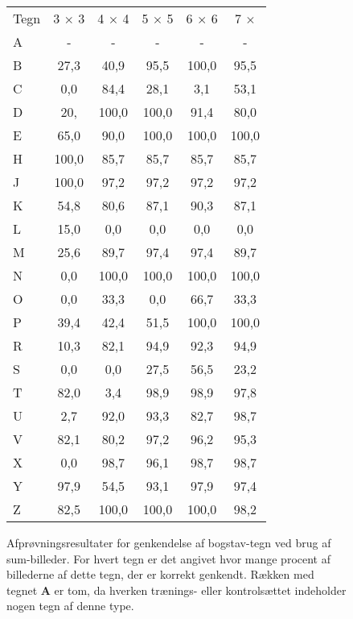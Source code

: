 \begin{figure}[htp]
\centering
\begin{tabular}{|l|c|c|c|c|c|}\hline
\rowcolor[gray]{0.9} \multicolumn{6}{|>{\columncolor[gray]{0.9}}c|}{\textbf{Sum-billeder}} \\ \hline
Tegn & 3 $\times$ 3 & 4 $\times$ 4 & 5 $\times$ 5 & 6 $\times$ 6 & 7 $\times$ \\\hline
A & - & - & - & - & -\\\hline
B & 27,3 & 40,9 & 95,5 & 100,0 & 95,5\\\hline
C & 0,0 & 84,4 & 28,1 & 3,1 & 53,1\\\hline
D & 20, & 100,0 & 100,0 & 91,4 & 80,0\\\hline
E & 65,0 & 90,0 & 100,0 & 100,0 & 100,0\\\hline
H & 100,0 & 85,7 & 85,7 & 85,7 & 85,7\\\hline
J & 100,0 & 97,2 & 97,2 & 97,2 & 97,2\\\hline
K & 54,8 & 80,6 & 87,1 & 90,3 & 87,1\\\hline 
L & 15,0 & 0,0 & 0,0 & 0,0 & 0,0\\\hline
M & 25,6 & 89,7 & 97,4 & 97,4 & 89,7\\\hline
N & 0,0 & 100,0 & 100,0 & 100,0 & 100,0\\\hline
O & 0,0 & 33,3 & 0,0 & 66,7 & 33,3\\\hline
P & 39,4 & 42,4 & 51,5 & 100,0 & 100,0\\\hline
R & 10,3 & 82,1 & 94,9 & 92,3 & 94,9\\\hline
S & 0,0 & 0,0 & 27,5 & 56,5 & 23,2\\\hline
T & 82,0 & 3,4 & 98,9 & 98,9 & 97,8\\\hline
U & 2,7 & 92,0 & 93,3 & 82,7 & 98,7\\\hline
V & 82,1 & 80,2 & 97,2 & 96,2 & 95,3\\\hline
X & 0,0 & 98,7 & 96,1 & 98,7 & 98,7\\\hline
Y & 97,9 & 54,5 & 93,1 & 97,9 & 97,4\\\hline
Z & 82,5 & 100,0 & 100,0 & 100,0 & 98,2\\\hline
\end{tabular}
\caption{Afprøvningsresultater for genkendelse af bogstav-tegn ved brug af sum-billeder. For hvert tegn er det angivet hvor mange procent af billederne af dette tegn, der er korrekt genkendt. Rækken med tegnet \textbf{A} er tom, da hverken trænings- eller kontrolsættet indeholder nogen tegn af denne type.}
\label{fig:test:sum_bogstav}
\end{figure}

